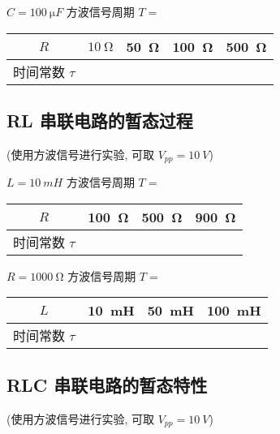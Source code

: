 \documentclass[signature=data]{physicsreport}
\begin{document}
$C=\qty{100}{\micro F}$ \qquad 方波信号周期 $T=$

\vspace*{.5em}
{\centering
    \begin{tabularx}{.7\textwidth}{|c|Y|Y|Y|Y|} \hline
        $R$         & $\qty{10}{\ohm}$ & \qty{50}{\ohm} & \qty{100}{\ohm} & \qty{500}{\ohm} \\\hline
        时间常数 $\tau$ &                  &                &                 &                 \\\hline
    \end{tabularx}
    \par}
\vspace*{.5em}

\subsection{RL 串联电路的暂态过程}
(使用方波信号进行实验, 可取 $V_{pp}=\qty{10}{V}$)

$L=\qty{10}{mH}$ \qquad 方波信号周期 $T=$

\vspace*{.5em}
{\centering
    \begin{tabularx}{.7\textwidth}{|c|Y|Y|Y|} \hline
        $R$         & \qty{100}{\ohm} & \qty{500}{\ohm} & \qty{900}{\ohm} \\\hline
        时间常数 $\tau$ &                 &                 &                 \\\hline
    \end{tabularx}
    \par}
\vspace*{.5em}

$R=\qty{1000}{\ohm}$ \qquad 方波信号周期 $T=$

\vspace*{.5em}
{\centering
    \begin{tabularx}{.7\textwidth}{|c|Y|Y|Y|} \hline
        $L$         & \qty{10}{mH} & \qty{50}{mH} & \qty{100}{mH} \\\hline
        时间常数 $\tau$ &              &              &               \\\hline
    \end{tabularx}
    \par}
\vspace*{.5em}

\subsection{RLC 串联电路的暂态特性}
(使用方波信号进行实验, 可取 $V_{pp}=\qty{10}{V}$)
\end{document}

